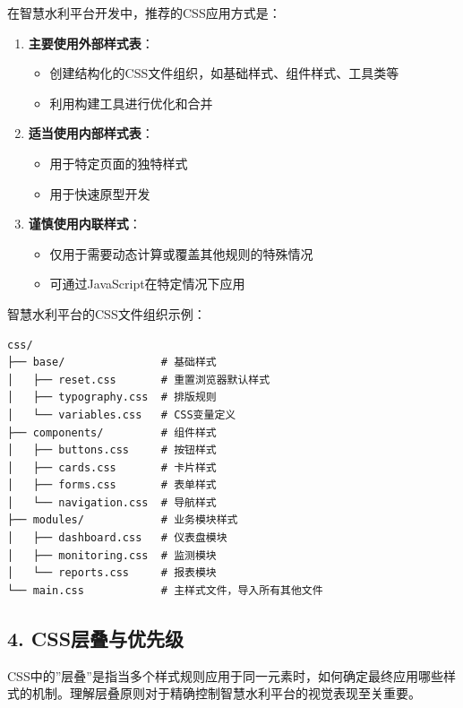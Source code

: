 在智慧水利平台开发中，推荐的CSS应用方式是：

\begin{enumerate}
\def\labelenumi{\arabic{enumi}.}
\tightlist
\item
  \textbf{主要使用外部样式表}：

  \begin{itemize}
  \tightlist
  \item
    创建结构化的CSS文件组织，如基础样式、组件样式、工具类等
  \item
    利用构建工具进行优化和合并
  \end{itemize}
\item
  \textbf{适当使用内部样式表}：

  \begin{itemize}
  \tightlist
  \item
    用于特定页面的独特样式
  \item
    用于快速原型开发
  \end{itemize}
\item
  \textbf{谨慎使用内联样式}：

  \begin{itemize}
  \tightlist
  \item
    仅用于需要动态计算或覆盖其他规则的特殊情况
  \item
    可通过JavaScript在特定情况下应用
  \end{itemize}
\end{enumerate}

智慧水利平台的CSS文件组织示例：

\begin{lstlisting}
css/
├── base/               # 基础样式
│   ├── reset.css       # 重置浏览器默认样式
│   ├── typography.css  # 排版规则
│   └── variables.css   # CSS变量定义
├── components/         # 组件样式
│   ├── buttons.css     # 按钮样式
│   ├── cards.css       # 卡片样式
│   ├── forms.css       # 表单样式
│   └── navigation.css  # 导航样式
├── modules/            # 业务模块样式
│   ├── dashboard.css   # 仪表盘模块
│   ├── monitoring.css  # 监测模块
│   └── reports.css     # 报表模块
└── main.css            # 主样式文件，导入所有其他文件
\end{lstlisting}

\subsection{4.
CSS层叠与优先级}\label{cssux5c42ux53e0ux4e0eux4f18ux5148ux7ea7}

CSS中的''层叠''是指当多个样式规则应用于同一元素时，如何确定最终应用哪些样式的机制。理解层叠原则对于精确控制智慧水利平台的视觉表现至关重要。

